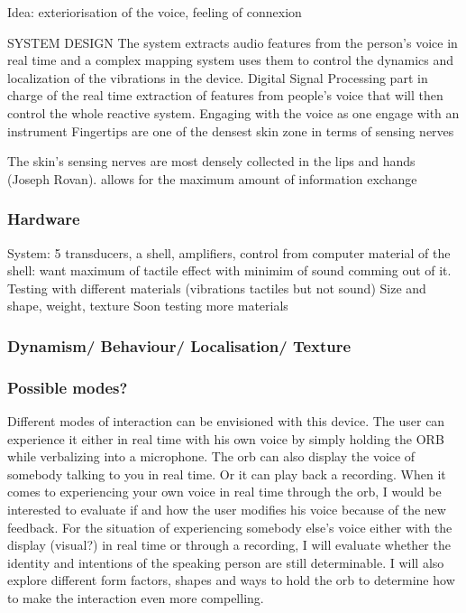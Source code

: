 \documentclass{nime-alternate}
\begin{document}
Idea: exteriorisation of the voice, feeling of connexion

SYSTEM DESIGN
The system extracts audio features from the person’s voice in real time and a complex mapping system uses them to control the dynamics and localization of the vibrations in the device.
Digital Signal Processing part in charge of the real time extraction of features from people’s voice that will then control the whole reactive system.
Engaging with the voice as one engage with an instrument 
Fingertips are one of the densest skin zone in terms of sensing nerves

The skin’s sensing nerves are most densely collected in the lips and hands (Joseph Rovan). allows for the maximum amount of information exchange




\subsubsection{Hardware}

System: 5 transducers, a shell, amplifiers, control from computer
material of the shell: want maximum of tactile effect with minimim of sound comming out of it. 
Testing with different materials (vibrations tactiles but not sound) 
Size and shape, weight, texture
Soon testing more materials


\subsubsection{Dynamism/ Behaviour/ Localisation/ Texture}

\subsubsection{Possible modes?}
Different modes of interaction can be envisioned with this device. The user can experience it either in real time with his own voice by simply holding the ORB while verbalizing into a microphone. The orb can also display the voice of somebody talking to you in real time. Or it can play back a recording. When it comes to experiencing your own voice in real time through the orb, I would be interested to evaluate if and how the user modifies his voice because of the new feedback. For the situation of experiencing somebody else’s voice either with the display (visual?) in real time or through a recording, I will evaluate whether the identity and intentions of the speaking person are still determinable. I will also explore different form factors, shapes and ways to hold the orb to determine how to make the interaction even more compelling.
\end{document}
